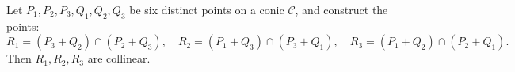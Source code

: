 Let $P_1, P_2, P_3, Q_1, Q_2, Q_3$ be six distinct points on a conic $\mathcal{C}$, and construct the points:
$$R_1 = (P_3 + Q_2) \cap (P_2 + Q_3), \quad R_2 = (P_1 + Q_3) \cap (P_3 + Q_1), \quad R_3 = (P_1 + Q_2) \cap (P_2 + Q_1).$$
Then $R_1, R_2, R_3$ are collinear.
